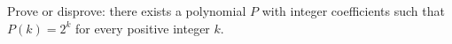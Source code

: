 Prove or disprove: there exists a polynomial \(P\) with integer coefficients such that \(P(k)=2^k\) for every positive integer \(k\).
